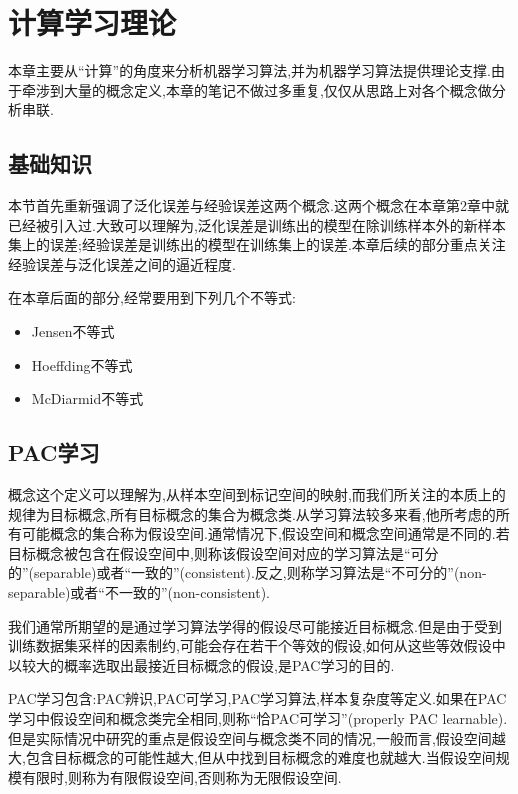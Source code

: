 \chapter{计算学习理论}

本章主要从``计算''的角度来分析机器学习算法,并为机器学习算法提供理论支撑.由于牵涉到大量的概念定义,本章的笔记不做过多重复,仅仅从思路上对各个概念做分析串联.

\section{基础知识}

本节首先重新强调了泛化误差与经验误差这两个概念.这两个概念在本章第2章中就已经被引入过.大致可以理解为,泛化误差是训练出的模型在除训练样本外的新样本集上的误差;经验误差是训练出的模型在训练集上的误差.本章后续的部分重点关注经验误差与泛化误差之间的逼近程度.

在本章后面的部分,经常要用到下列几个不等式:
\begin{itemize}
\item Jensen不等式
\item Hoeffding不等式
\item McDiarmid不等式
\end{itemize}

\section{PAC学习}

概念这个定义可以理解为,从样本空间到标记空间的映射,而我们所关注的本质上的规律为目标概念,所有目标概念的集合为概念类.从学习算法较多来看,他所考虑的所有可能概念的集合称为假设空间.通常情况下,假设空间和概念空间通常是不同的.若目标概念被包含在假设空间中,则称该假设空间对应的学习算法是``可分的''(separable)或者``一致的''(consistent).反之,则称学习算法是``不可分的''(non-separable)或者``不一致的''(non-consistent).

我们通常所期望的是通过学习算法学得的假设尽可能接近目标概念.但是由于受到训练数据集采样的因素制约,可能会存在若干个等效的假设,如何从这些等效假设中以较大的概率选取出最接近目标概念的假设,是PAC学习的目的.

PAC学习包含:PAC辨识,PAC可学习,PAC学习算法,样本复杂度等定义.如果在PAC学习中假设空间和概念类完全相同,则称``恰PAC可学习''(properly PAC learnable).但是实际情况中研究的重点是假设空间与概念类不同的情况,一般而言,假设空间越大,包含目标概念的可能性越大,但从中找到目标概念的难度也就越大.当假设空间规模有限时,则称为有限假设空间,否则称为无限假设空间.

